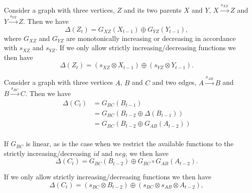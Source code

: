 \documentclass[]{article}
\begin{document}
Consider a graph with three vertices, $Z$ and its two parents
$X$ and $Y$, $X\xrightarrow{s_{XZ}} Z$ and $Y\xrightarrow{s_{YZ}} Z$.
%
Then we have
\[\Delta(Z_t) = G_{XZ}(X_{t-1}) \oplus G_{YZ}(Y_{t-1}),\]
where $G_{XZ}$ and $G_{YZ}$ are monotonically increasing or decreasing in
accordance with $s_{XZ}$ and $s_{YZ}$.
%
If we only allow strictly increasing/decreasing functions we then have
\[\Delta(Z_t) = (s_{XZ}\otimes X_{t-1})\oplus (s_{YZ}\otimes Y_{t-1}).\]

Consider a graph with three vertices $A$, $B$ and $C$ and two edges,
$A\xrightarrow{s_{AB}} B$ and $B\xrightarrow{s_{BC}} C$. Then we have
\begin{align*}
\Delta(C_t) &= G_{BC}(B_{t-1})\\
&= G_{BC}(B_{t-2} \oplus \Delta(B_{t-1}))\\
&= G_{BC}(B_{t-2}  \oplus G_{AB}(A_{t-2}))\\
\end{align*}

If $G_{BC}$ is linear, as is the case when we restrict the available functions
to the strictly increasing/decreasing $id$ and $neg$,
we then have
\[\Delta(C_t) = G_{BC}(B_{t-2})\oplus G_{BC}\circ G_{AB}(A_{t-2}).\]

If we only allow strictly increasing/decreasing functions we then have
\[\Delta(C_t) = (s_{BC}\otimes B_{t-2})\oplus (s_{BC}\otimes s_{AB}\otimes A_{t-2}),\]
\end{document}

